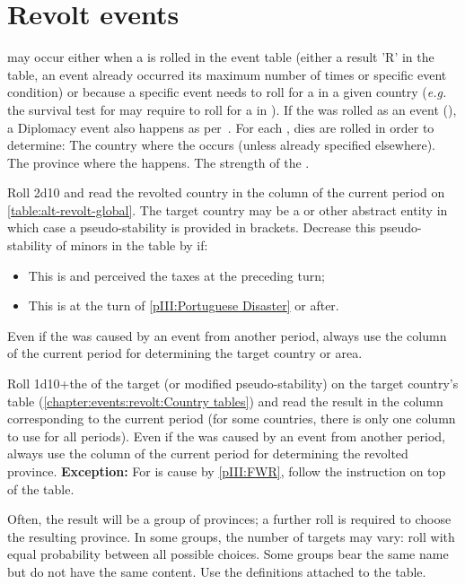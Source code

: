 \section{Revolt events}\label{chEvents:Revolts}

\aparag \REVOLT may occur either when a \RD is rolled in the event table
(either a result 'R' in the table, an event already occurred its maximum
number of times or specific event condition) or because a specific event
needs to roll for a \REVOLT in a given country (\emph{e.g.} the survival
test for \TUR may require to roll for a \REVOLT in \paysmajeurTurquie).
\aparag If the \REVOLT was rolled as an event (\RD), a Diplomacy event
also happens as per~.
\aparag For each \REVOLT , dies are rolled in order to determine:
\bparag The country where the \REVOLT occurs (unless already specified
elsewhere).
\bparag The province where the \REVOLT happens.
\bparag The strength of the \REVOLT .

\aparag Roll 2d10 and read the revolted country in the column of the
current period on \ref{table:alt-revolt-global}. The target country may
be a \MIN or other abstract entity in which case a pseudo-stability is
provided in brackets.
\bparag Decrease this pseudo-stability of minors in the table by
 if:
\begin{itemize}
\item This is \HOLhol and \SPA perceived the taxes at the preceding
  turn;
\item This is \PORpor at the turn of \ref{pIII:Portuguese Disaster} or
  after.
\end{itemize}
\bparag Even if the \REVOLT was caused by an event from another period,
always use the column of the current period for determining the target
country or area.

\aparag Roll 1d10+the \STAB of the target (or modified pseudo-stability)
on the target country's table (\ref{chapter:events:revolt:Country
  tables}) and read the result in the column corresponding to the
current period (for some countries, there is only one column to use for
all periods).
\bparag Even if the \REVOLT was caused by an event from another period,
always use the column of the current period for determining the revolted
province.
\bparag \textbf{Exception:} For \REVOLT is \FRA cause by \ref{pIII:FWR},
follow the instruction on top of the table.

\aparag[Groups] Often, the result will be a group of provinces; a
further roll is required to choose the resulting province.
\bparag In some groups, the number of targets may vary: roll with equal
probability between all possible choices.
\bparag Some groups bear the same name but do not have the same
content. Use the definitions attached to the table.

